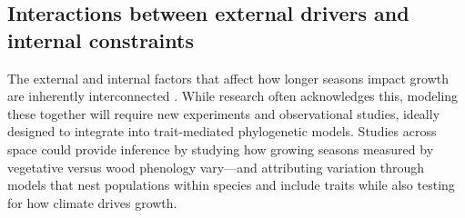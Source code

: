 \documentclass[11pt]{article}
\begin{document}

\subsection*{Interactions between external drivers and internal constraints} %


The external and internal factors that affect how longer seasons impact growth are inherently interconnected \citep{nobel1983biophysical}. While research often acknowledges this, modeling these together will require new experiments and observational studies, ideally designed to integrate into trait-mediated phylogenetic models. Studies across space could provide inference by studying how growing seasons measured by vegetative versus wood phenology vary---and attributing variation through models that nest populations within species and include traits while also testing for how climate drives growth.  
\end{document}
